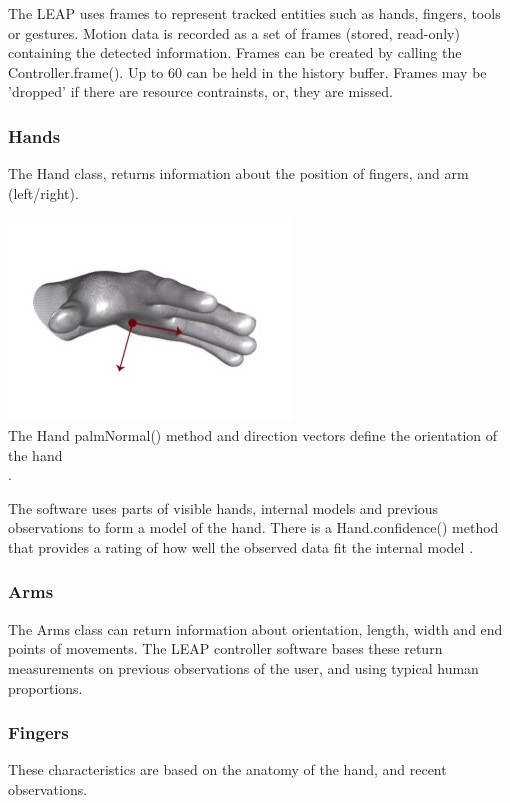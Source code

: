 \documentclass[a4paper, 11pt]{article}
\begin{document}
The LEAP uses frames to represent tracked entities such as hands, fingers, tools or gestures. Motion data is recorded as a set of frames (stored, read-only) containing the detected information. Frames can be created by calling the Controller.frame(). Up to 60 can be held in the history buffer. Frames may be 'dropped' if there are resource contrainsts, or, they are missed.

\subsubsection{Hands}
The Hand class, returns information about the position of fingers, and arm (left/right).

\begin{center}
\includegraphics[scale=0.6]{palm}\\
The Hand palmNormal() method and direction vectors define the orientation of the hand \cite{leap}\\.
\end{center}

The software uses parts of visible hands, internal models and previous observations to form a model of the hand. There is a Hand.confidence() method that provides a rating of how well the observed data fit the internal model \cite{leap}.

\subsubsection{Arms}
The Arms class can return information about orientation, length, width and end points of movements. The LEAP controller software bases these return measurements on previous observations of the user, and using typical human proportions.

\subsubsection{Fingers}
These characteristics are based on the anatomy of the hand, and recent observations. 
\end{document}

